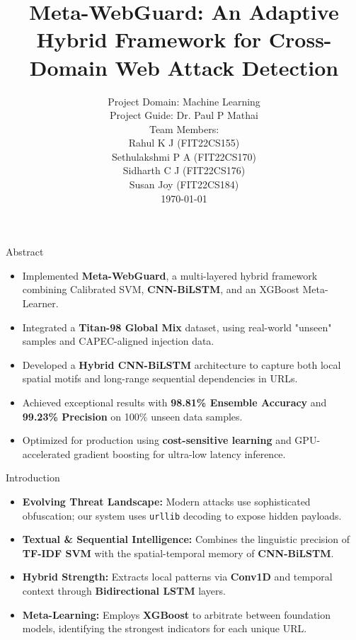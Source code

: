 \documentclass[aspectratio=169,xcolor=dvipsnames]{beamer}
\title{Meta-WebGuard: An Adaptive Hybrid Framework for Cross-Domain
Web Attack Detection}
\author{\small Project Domain: Machine Learning\\
Project Guide: Dr. Paul P Mathai\\
Team Members: \\
Rahul K J (FIT22CS155)\\
Sethulakshmi P A (FIT22CS170)\\
Sidharth C J (FIT22CS176)\\
Susan Joy (FIT22CS184)\\[0.5cm]
\today
}
\begin{document}
\begin{frame}
    \titlepage
\end{frame}

\begin{frame}{Abstract}
\begin{itemize}
    \item Implemented \textbf{Meta-WebGuard}, a multi-layered hybrid framework combining Calibrated SVM, \textbf{CNN-BiLSTM}, and an XGBoost Meta-Learner.
    \item Integrated a \textbf{Titan-98 Global Mix} dataset, using real-world "unseen" samples and CAPEC-aligned injection data.
    \item Developed a \textbf{Hybrid CNN-BiLSTM} architecture to capture both local spatial motifs and long-range sequential dependencies in URLs.
    \item Achieved exceptional results with \textbf{98.81\% Ensemble Accuracy} and \textbf{99.23\% Precision} on 100\% unseen data samples.
    \item Optimized for production using \textbf{cost-sensitive learning} and GPU-accelerated gradient boosting for ultra-low latency inference.
\end{itemize}
\end{frame}

\begin{frame}{Introduction}
\begin{itemize}
    \item \textbf{Evolving Threat Landscape:} Modern attacks use sophisticated obfuscation; our system uses \texttt{urllib} decoding to expose hidden payloads.
    \item \textbf{Textual \& Sequential Intelligence:} Combines the linguistic precision of \textbf{TF-IDF SVM} with the spatial-temporal memory of \textbf{CNN-BiLSTM}.
    \item \textbf{Hybrid Strength:} Extracts local patterns via \textbf{Conv1D} and temporal context through \textbf{Bidirectional LSTM} layers.
    \item \textbf{Meta-Learning:} Employs \textbf{XGBoost} to arbitrate between foundation models, identifying the strongest indicators for each unique URL.
\end{itemize}
\end{frame}
\end{document}
